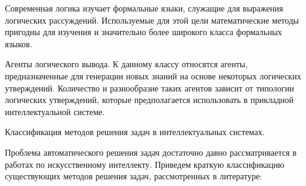 Современная логика изучает формальные языки, служащие для выражения логических рассуждений. Используемые для этой цели математические методы пригодны для изучения и значительно более широкого класса формальных языков.

Агенты логического вывода. К данному классу относятся агенты, предназначенные для генерации новых знаний на основе некоторых логических утверждений. Количество и разнообразие таких агентов зависит от типологии
логических утверждений, которые предполагается использовать в прикладной интеллектуальной системе.

Классификация методов решения задач в интеллектуальных системах.

Проблема автоматического решения задач достаточно давно рассматривается в работах по искусственному интеллекту. Приведем краткую классификацию существующих методов решения задач, рассмотренных в литературе:
